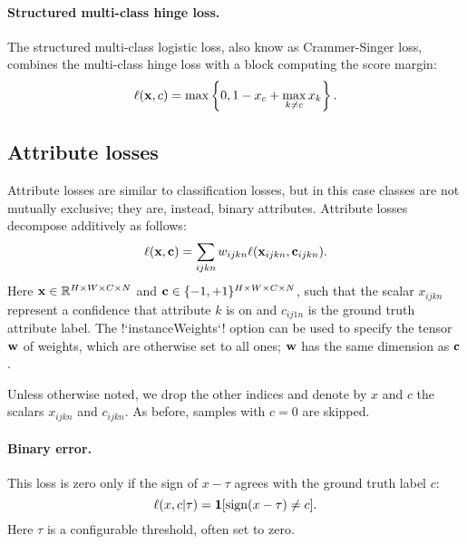 \paragraph{Structured multi-class hinge loss.} The structured multi-class logistic loss, also know as Crammer-Singer loss, combines the multi-class hinge loss with a block computing the score margin:
\begin{equation}\label{e:loss-structuredmulticlasshinge}
	\ell(\mathbf{x}, c) = \max\left\{0, 1 - x_c + \max_{k \not= c} x_k\right\}.
\end{equation}

\subsection{Attribute losses}\label{s:loss-attributes}

Attribute losses are similar to classification losses, but in this case classes are not mutually exclusive; they are, instead, binary attributes. Attribute losses decompose additively as follows:
\begin{equation}\label{e:addlossattribute}
\ell(\mathbf{x},\mathbf{c}) = \sum_{ijkn} w_{ijkn} \ell(\mathbf{x}_{ijkn}, \mathbf{c}_{ijkn}).
\end{equation}
Here $\mathbf{x}\in \mathbb{R}^{H \times W \times C \times N}$ and $\mathbf{c} \in \{-1,+1\}^{H \times W \times C \times N}$, such that the scalar $x_{ijkn}$ represent a confidence that attribute $k$ is on and $c_{ij1n}$ is the ground truth attribute label. The !`instanceWeights`! option can be used to specify the tensor $\mathbf{w}$ of weights, which are otherwise set to all ones; $\mathbf{w}$ has the same dimension as $\mathbf{c}$.

 Unless otherwise noted, we drop the other indices and denote by $x$ and $c$  the scalars $x_{ijkn}$ and  $c_{ijkn}$. As before, samples with $c=0$ are skipped.

\paragraph{Binary error.} This loss is zero only if the sign of $x - \tau$ agrees with the ground truth label $c$:
\begin{equation}\label{e:loss-binary}
 \ell(x,c|\tau) = \mathbf{1}[\sign(x-\tau) \not= c].
\end{equation}
Here $\tau$ is a configurable threshold, often set to zero.

